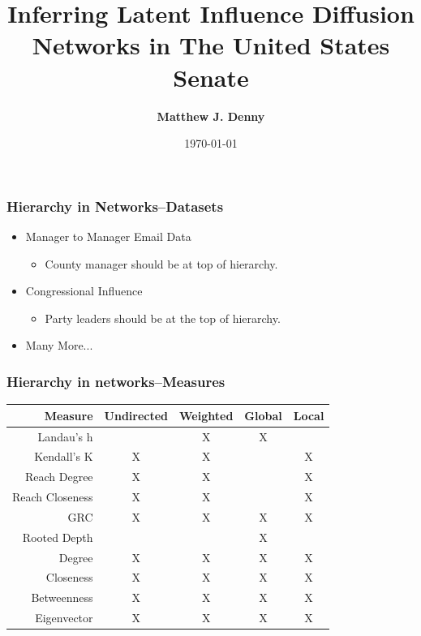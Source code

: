 \documentclass[xcolor={table}]{beamer}
\title{Inferring Latent Influence Diffusion Networks in The United States Senate}
\author{\Large\textbf{Matthew J. Denny}}
\institute{\Large Penn State University --- 
 \texttt{mzd5530@psu.edu}\\
 \color{blue}\texttt{www.mjdenny.com}\\ 
 \texttt{@MatthewJDenny}
}
\date{ \today }
\begin{document}






\begin{frame}\frametitle{Hierarchy in Networks--Datasets}
	\LARGE
\begin{itemize}
	\item Manager to Manager Email Data
	\vspace{.2in}
	\begin{itemize}
		\Large
		\item County manager should be at top of hierarchy.
	\end{itemize}
	\vspace{.2in}
	
	\item Congressional Influence
	\vspace{.2in}
	\begin{itemize}
		\Large
		\item Party leaders should be at the top of hierarchy.
	\end{itemize}
	\item Many More...
\end{itemize}
\end{frame}

\begin{frame}\frametitle{Hierarchy in networks--Measures}
\begin{table}
	\begin{tabular}{| r || c | c | c | c |}
		\hline
		Measure & Undirected & Weighted & Global & Local \\
		\hline
		Landau's h & & X& X& \\
		Kendall's K & X& X& &X\\
		Reach Degree & X& X& &X\\
		Reach Closeness & X& X& &X\\
		GRC & X& X& X&X\\
		Rooted Depth & & & X&\\
		Degree & X& X& X&X\\
		Closeness & X& X& X&X\\
		Betweenness & X& X& X&X\\
		Eigenvector &  X& X& X& X \\
		\hline
	\end{tabular}
\end{table}
\end{frame}
\end{document}

